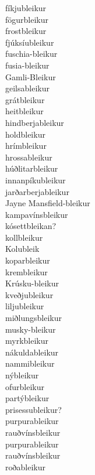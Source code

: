 \documentclass[../samsetningasafn.tex]{subfiles}
\begin{document}
\begin{bigwordlist}
\begin{center}
\begin{footnotesize}
\begin{multicols}{4}
\begin{description}
		\item [fíkjubleikur]
		\item [fögurbleikur]
		\item [frostbleikur]
		\item [fjúksíubleikur]
		\item [fuschia-bleikur]
		\item [fusia-bleikur]
		\item [Gamli-Bleikur]
		\item [geilsableikur]
		\item [grátbleikur]
		\item [heitbleikur]
		\item [hindberjableikur]
		\item [holdbleikur]
		\item [hrímbleikur]
		\item [hrossableikur]
		\item [húðlitarbleikur]
		\item [innanpíkubleikur]
		\item [jarðarberjableikur]
		\item [Jayne Mansfield-bleikur]
		\item [kampavínsbleikur]
		\item [kósettbleikan?]
		\item [kollbleikur]
		\item [Kolubleik]
		\item [koparbleikur]
		\item [krembleikur]
		\item [Krúsku-bleikur]
		\item [kveðjubleikur]
		\item [liljubleikur]
		\item [miðlungsbleikur]
		\item [musky-bleikur]
		\item [myrkbleikur]
		\item [nákuldableikur]
		\item [nammibleikur]
		\item [nýbleikur]
		\item [ofurbleikur]
		\item [partýbleikur]
		\item [prisessubleikur?]
		\item [purpurableikur]
		\item [rauðvínsbleikur]
		\item [purpurableikur]
		\item [rauðvínsbleikur]
		\item [roðableikur]

\end{description}
\end{multicols}
\end{footnotesize}
\end{center}
\end{bigwordlist}
\end{document}

